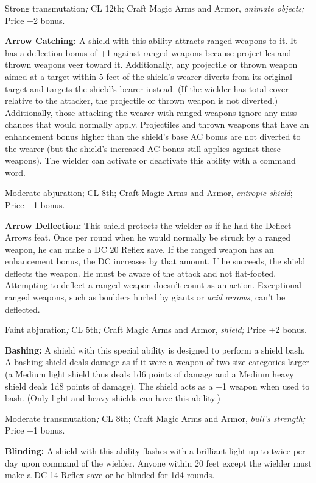 \documentclass{article}
\begin{document}
Strong transmutation\textit{; }CL 12th; Craft Magic Arms and Armor, \textit{animate 
objects; }Price +2 bonus.

\textbf{Arrow Catching:} A shield with this ability attracts ranged weapons to 
it. It has a deflection bonus of +1 against ranged weapons because projectiles 
and thrown weapons veer toward it. Additionally, any projectile or thrown weapon 
aimed at a target within 5 feet of the shield's wearer diverts from its original 
target and targets the shield's bearer instead. (If the wielder has total cover 
relative to the attacker, the projectile or thrown weapon is not diverted.) Additionally, 
those attacking the wearer with ranged weapons ignore any miss chances that would 
normally apply. Projectiles and thrown weapons that have an enhancement bonus higher 
than the shield's base AC bonus are not diverted to the wearer (but the shield's 
increased AC bonus still applies against these weapons). The wielder can activate 
or deactivate this ability with a command word.

Moderate abjuration; CL 8th; Craft Magic Arms and Armor, \textit{entropic shield}; 
Price +1 bonus.

\textbf{Arrow Deflection:} This shield protects the wielder as if he had the Deflect 
Arrows feat. Once per round when he would normally be struck by a ranged weapon, 
he can make a DC 20 Reflex save. If the ranged weapon has an enhancement bonus, 
the DC increases by that amount. If he succeeds, the shield deflects the weapon. 
He must be aware of the attack and not flat-footed. Attempting to deflect a ranged 
weapon doesn't count as an action. Exceptional ranged weapons, such as boulders 
hurled by giants or \textit{acid arrows}, can't be deflected.

Faint abjuration\textit{; }CL 5th\textit{; }Craft Magic Arms and Armor, \textit{shield; 
}Price +2 bonus.

\textbf{Bashing:} A shield with this special ability is designed to perform a shield 
bash. A bashing shield deals damage as if it were a weapon of two size categories 
larger (a Medium light shield thus deals 1d6 points of damage and a Medium heavy 
shield deals 1d8 points of damage). The shield acts as a +1 weapon when used to 
bash. (Only light and heavy shields can have this ability.)

Moderate transmutation\textit{; }CL 8th; Craft Magic Arms and Armor, \textit{bull's 
strength; }Price +1 bonus.

\textbf{Blinding:} A shield with this ability flashes with a brilliant light up 
to twice per day upon command of the wielder. Anyone within 20 feet except the 
wielder must make a DC 14 Reflex save or be blinded for 1d4 rounds.
\end{document}

